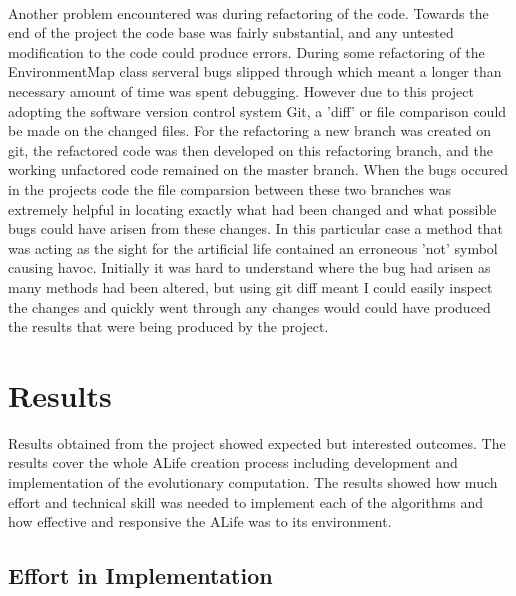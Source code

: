 \documentclass[12pt]{article}
\begin{document}
\paragraph{}
Another problem encountered was during refactoring of the code. Towards the end of the project the code base was fairly substantial, and any
untested modification to the code could produce errors. During some refactoring of the EnvironmentMap class serveral bugs slipped through
which meant a longer than necessary amount of time was spent debugging. However due to this project adopting the software version control system
Git, a 'diff' or file comparison could be made on the changed files. For the refactoring a new branch was created on git, the refactored code
was then developed on this refactoring branch, and the working unfactored code remained on the master branch. When the bugs occured in the
projects code the file comparsion between these two branches was extremely helpful in locating exactly what had been changed and what
possible bugs could have arisen from these changes. In this particular case a method that was acting as the sight for the artificial life
contained an erroneous 'not' symbol causing havoc. Initially it was hard to understand where the bug had arisen as many methods had been
altered, but using git diff meant I could easily inspect the changes and quickly went through any changes would could have produced the
results that were being produced by the project.

\section{Results}

Results obtained from the project showed expected but interested outcomes. The results cover the whole ALife creation process including
development and implementation of the evolutionary computation. The results showed how much effort and technical skill was needed to
implement each of the algorithms and how effective and responsive the ALife was to its environment.

\subsection{Effort in Implementation}
\end{document}
